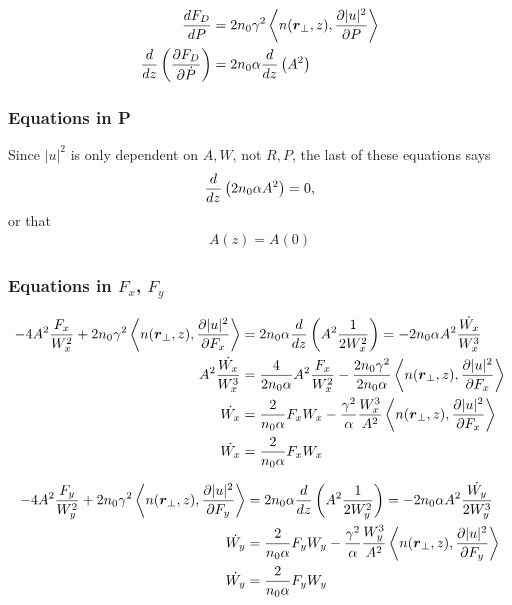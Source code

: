 \begin{equation}
\begin{split}
    \frac{d{F_{D}}}{d{P}}  &= 2n_0 \gamma^2 \left< n(\mbox{\boldmath{$r$}}_{\perp},z),\frac{\partial |u|^2}{\partial P}  \right> \\
\frac{d{}}{d{z}}\left(\frac{\partial F_{D}}{\partial \dot{P}}\right) &= 2 n_0 \alpha \frac{d{}}{d{z}}\left(A^2 \right)  
\end{split}
\end{equation}


\subsubsection{Equations in P}
Since $|u|^2$ is only dependent on $A,W$, not $R,P$, the last of these equations says
\begin{equation}
\begin{split}
    \frac{d{}}{d{z}}\left( 2 n_0 \alpha A^2 \right) = 0,
\end{split}
\end{equation}
or that
\begin{equation}
\begin{split}
    A(z) = A(0)
\end{split}
\end{equation}


\subsubsection{Equations in $F_x$, $F_y$}

\begin{equation}
\begin{split}
    - 4 A^2 \frac{F_{x}}{W_{x}^2} + 2n_0 \gamma^2 \left<n(\mbox{\boldmath{$r$}}_{\perp},z),\frac{\partial |u|^2}{\partial F_x}\right> &= 2 n_0 \alpha \frac{d{}}{d{z}}\left(A^2 \frac{1}{2W_{x}^2} \right) = -2 n_0 \alpha A^2 \frac{\dot{W_{x}}}{W_{x}^3} \\
      A^2 \frac{\dot{W_{x}}}{W_{x}^3} &= \frac{4}{2 n_0 \alpha} A^2 \frac{F_{x}}{W_{x}^2} - \frac{2n_0 \gamma^2}{2 n_0 \alpha}  \left<n(\mbox{\boldmath{$r$}}_{\perp},z),\frac{\partial |u|^2}{\partial F_x}\right>\\
     \dot{W_{x}} &= \frac{2}{n_0 \alpha} F_{x}W_{x} - \frac{\gamma^2}{\alpha} \frac{W_{x}^3}{A^2} \left<n(\mbox{\boldmath{$r$}}_{\perp},z),\frac{\partial |u|^2}{\partial F_x}\right> \\
     \dot{W_{x}} &= \frac{2}{n_0 \alpha} F_{x}W_{x}
    \end{split}
\end{equation}

\begin{equation}
\begin{split}
  - 4 A^2 \frac{F_{y}}{W_{y}^2} + 2n_0 \gamma^2 \left<n(\mbox{\boldmath{$r$}}_{\perp},z),\frac{\partial |u|^2}{\partial F_y}\right>
    &= 2 n_0 \alpha \frac{d{}}{d{z}}\left(A^2 \frac{1}{2W_{y}^2} \right) = -2 n_0 \alpha A^2 \frac{\dot{W_{y}}}{2W_{y}^3} \\
   \dot{W_{y}} &= \frac{2}{n_0 \alpha} F_{y}W_{y} - \frac{\gamma^2}{\alpha} \frac{W_{y}^3}{A^2} \left<n(\mbox{\boldmath{$r$}}_{\perp},z),\frac{\partial |u|^2}{\partial F_y}\right> \\
      \dot{W_{y}} &= \frac{2}{n_0 \alpha} F_{y}W_{y} 
\end{split}
\end{equation}


